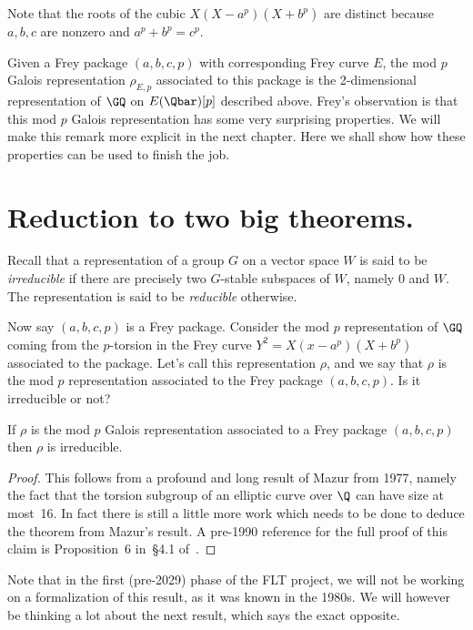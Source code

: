 Note that the roots of the cubic $X(X-a^p)(X+b^p)$ are distinct because $a,b,c$ are nonzero and
$a^p+b^p=c^p$.

Given a Frey package $(a,b,c,p)$ with corresponding Frey curve $E$, the mod $p$ Galois
representation $\rho_{E,p}$ associated to this package is the 2-dimensional representation of
$\GQ$ on $E(\Qbar)[p]$ described above. Frey's observation is that this mod $p$ Galois
representation has some very surprising properties. We will make this remark more explicit
in the next chapter. Here we shall show how these properties can be used to finish the job.

\section{Reduction to two big theorems.}

Recall that a representation of a group $G$ on a vector space $W$ is said to be \emph{irreducible}
if there are precisely two $G$-stable subspaces of $W$, namely $0$ and $W$.
The representation is said to be \emph{reducible} otherwise.

Now say $(a,b,c,p)$ is a Frey package.
Consider the mod $p$ representation of $\GQ$ coming from the $p$-torsion in the Frey
curve $Y^2=X(x-a^p)(X+b^p)$ associated to the package. Let's call this representation $\rho$,
and we say that $\rho$ is the mod $p$ representation associated to the Frey package $(a,b,c,p)$.
Is it irreducible or not?

\begin{theorem}[Mazur]
  \label{FLT.Mazur_Frey}
  \leanok
  If $\rho$ is the mod $p$ Galois representation associated to a Frey package $(a,b,c,p)$ then
  $\rho$ is irreducible.
\end{theorem}
\begin{proof}
  \notready
  This follows from a profound and long result of Mazur \cite{mazur-torsion} from 1977,
  namely the fact that the torsion subgroup of an elliptic curve over $\Q$ can have size at most~16.
  In fact there is still a little more work which needs to be done to deduce the theorem from
  Mazur's result. A pre-1990 reference for the full proof of this claim is Proposition~6
  in~\S4.1 of~\cite{serreconj}.
\end{proof}

Note that in the first (pre-2029) phase of the FLT project, we will not be working on
a formalization of this result, as it was known in the 1980s. We will however be thinking
a lot about the next result, which says the exact opposite.

